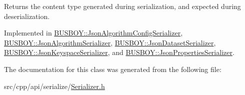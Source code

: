 Returns the content type generated during serialization, and expected during deserialization. 

Implemented in \hyperlink{classBUSBOY_1_1JsonAlgorithmConfigSerializer_ab477ff6ef5cd3a5310d4716c358e16fd}{BUSBOY::JsonAlgorithmConfigSerializer}, \hyperlink{classBUSBOY_1_1JsonAlgorithmSerializer_a4cda821d824b5e42b927e99b54c75ba0}{BUSBOY::JsonAlgorithmSerializer}, \hyperlink{classBUSBOY_1_1JsonDatasetSerializer_a80f71734e5e99b3230cfdca597f6d636}{BUSBOY::JsonDatasetSerializer}, \hyperlink{classBUSBOY_1_1JsonKeyspaceSerializer_a3fb88c9ae3f198a5aba3ba8a69337f9c}{BUSBOY::JsonKeyspaceSerializer}, and \hyperlink{classBUSBOY_1_1JsonPropertiesSerializer_ae05a9840dc947cb95e541e58b1af32ac}{BUSBOY::JsonPropertiesSerializer}.

The documentation for this class was generated from the following file:\begin{DoxyCompactItemize}
\item 
src/cpp/api/serialize/\hyperlink{Serializer_8h}{Serializer.h}\end{DoxyCompactItemize}
